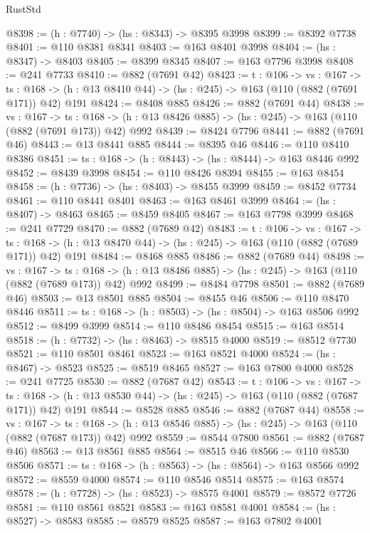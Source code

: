 \begin{lexlean}{RustStd}
\begin{coremodule}
@8398 := (h : @7740) -> (hs : @8343) -> @8395 @3998
@8399 := @8392 @7738
@8401 := @110 @8381 @8341
@8403 := @163 @8401 @3998
@8404 := (hs : @8347) -> @8403
@8405 := @8399 @8345
@8407 := @163 @7796 @3998
@8408 := @241 @7733
@8410 := @882 (@7691 @42)
@8423 := {t : @106} ->
  {vs : @167} ->
  {ts : @168} -> (h : @13 @8410 @44) -> (hs : @245) -> @163 (@110 (@882 (@7691 @171)) @42) @191
@8424 := @8408 @885
@8426 := @882 (@7691 @44)
@8438 := {vs : @167} ->
  {ts : @168} -> (h : @13 @8426 @885) -> (hs : @245) -> @163 (@110 (@882 (@7691 @173)) @42) @992
@8439 := @8424 @7796
@8441 := @882 (@7691 @46)
@8443 := @13 @8441 @885
@8444 := @8395 @46
@8446 := @110 @8410 @8386
@8451 := {ts : @168} -> (h : @8443) -> (hs : @8444) -> @163 @8446 @992
@8452 := @8439 @3998
@8454 := @110 @8426 @8394
@8455 := @163 @8454
@8458 := (h : @7736) -> (hs : @8403) -> @8455 @3999
@8459 := @8452 @7734
@8461 := @110 @8441 @8401
@8463 := @163 @8461 @3999
@8464 := (hs : @8407) -> @8463
@8465 := @8459 @8405
@8467 := @163 @7798 @3999
@8468 := @241 @7729
@8470 := @882 (@7689 @42)
@8483 := {t : @106} ->
  {vs : @167} ->
  {ts : @168} -> (h : @13 @8470 @44) -> (hs : @245) -> @163 (@110 (@882 (@7689 @171)) @42) @191
@8484 := @8468 @885
@8486 := @882 (@7689 @44)
@8498 := {vs : @167} ->
  {ts : @168} -> (h : @13 @8486 @885) -> (hs : @245) -> @163 (@110 (@882 (@7689 @173)) @42) @992
@8499 := @8484 @7798
@8501 := @882 (@7689 @46)
@8503 := @13 @8501 @885
@8504 := @8455 @46
@8506 := @110 @8470 @8446
@8511 := {ts : @168} -> (h : @8503) -> (hs : @8504) -> @163 @8506 @992
@8512 := @8499 @3999
@8514 := @110 @8486 @8454
@8515 := @163 @8514
@8518 := (h : @7732) -> (hs : @8463) -> @8515 @4000
@8519 := @8512 @7730
@8521 := @110 @8501 @8461
@8523 := @163 @8521 @4000
@8524 := (hs : @8467) -> @8523
@8525 := @8519 @8465
@8527 := @163 @7800 @4000
@8528 := @241 @7725
@8530 := @882 (@7687 @42)
@8543 := {t : @106} ->
  {vs : @167} ->
  {ts : @168} -> (h : @13 @8530 @44) -> (hs : @245) -> @163 (@110 (@882 (@7687 @171)) @42) @191
@8544 := @8528 @885
@8546 := @882 (@7687 @44)
@8558 := {vs : @167} ->
  {ts : @168} -> (h : @13 @8546 @885) -> (hs : @245) -> @163 (@110 (@882 (@7687 @173)) @42) @992
@8559 := @8544 @7800
@8561 := @882 (@7687 @46)
@8563 := @13 @8561 @885
@8564 := @8515 @46
@8566 := @110 @8530 @8506
@8571 := {ts : @168} -> (h : @8563) -> (hs : @8564) -> @163 @8566 @992
@8572 := @8559 @4000
@8574 := @110 @8546 @8514
@8575 := @163 @8574
@8578 := (h : @7728) -> (hs : @8523) -> @8575 @4001
@8579 := @8572 @7726
@8581 := @110 @8561 @8521
@8583 := @163 @8581 @4001
@8584 := (hs : @8527) -> @8583
@8585 := @8579 @8525
@8587 := @163 @7802 @4001

\end{coremodule}
\end{lexlean}
